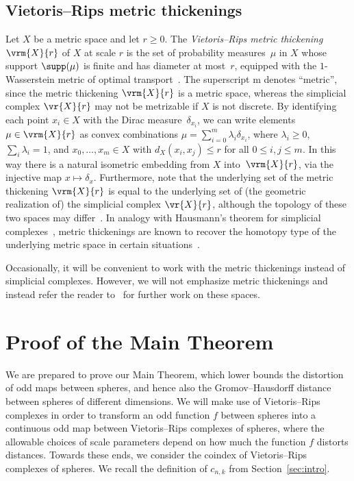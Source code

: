 \documentclass[11pt, reqno, english]{amsart}
\begin{document}
\subsection*{Vietoris--Rips metric thickenings}
Let $X$ be a metric space and let $r\geq 0$.
The \emph{Vietoris--Rips metric thickening} $\vrm{X}{r}$ of $X$ at scale $r$ is the set of probability measures~$\mu$ in $X$ whose support $\supp(\mu)$ is finite and has diameter at most~$r$, equipped with the $1$-Wasserstein metric of optimal transport~\cite{AAF}.
The superscript $\mathrm{m}$ denotes ``metric'', since the metric thickening $\vrm{X}{r}$ is a metric space, whereas the simplicial complex $\vr{X}{r}$ may not be metrizable if $X$ is not discrete.
By identifying each point $x_i \in X$ with the Dirac measure~$\delta_{x_i}$, we can write elements $\mu \in \vrm{X}{r}$ as convex combinations $\mu = \sum_{i=0}^m \lambda_i\delta_{x_i}$, where $\lambda_i \ge 0$, $\sum_i \lambda_i = 1$, and $x_0, \dots, x_m \in X$ with $d_X(x_i,x_j) \le r$ for all $0\le i,j\le m$.
In this way there is a natural isometric embedding from $X$ into~$\vrm{X}{r}$, via the injective map $x\mapsto \delta_x$.
Furthermore, note that the underlying set of the metric thickening $\vrm{X}{r}$ is equal to the underlying set of (the geometric realization of) the simplicial complex $\vr{X}{r}$, although the topology of these two spaces may differ~\cite{AAF}.
In analogy with Hausmann's theorem for simplicial complexes~\cite{Hausmann1995}, metric thickenings are known to recover the homotopy type of the underlying metric space in certain situations~\cite{AAF,AM}.

Occasionally, it will be convenient to work with the metric thickenings instead of simplicial complexes.
However, we will not emphasize metric thickenings and instead refer the reader to~\cite{ABF,HA-FF-ZV,AdamsHeimPeterson,AMMW} for further work on these spaces.



\section{Proof of the Main Theorem}
\label{sec:main-theorem-proof}

We are prepared to prove our Main Theorem, which lower bounds the distortion of odd maps between spheres, and hence also the Gromov--Hausdorff distance between spheres of different dimensions.
We will make use of Vietoris--Rips complexes in order to transform an odd function $f$ between spheres into a continuous odd map between Vietoris--Rips complexes of spheres, where the allowable choices of scale parameters depend on how much the function $f$ distorts distances.
Towards these ends, we consider the coindex of Vietoris--Rips complexes of spheres.
We recall the definition of $c_{n,k}$ from Section~\ref{sec:intro}.
\end{document}

